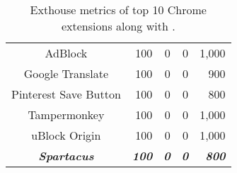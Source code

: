 {\begin{table}[t]
{\begin{tabular}{crrrr}
\rowcolor[HTML]{C0C0C0} 
AdBlock                     & 100                                & 0                                                                                        & 0                                                                                              & 1,000                                                                            \\
\rowcolor[HTML]{EFEFEF} 
Google Translate            & 100                                & 0                                                                                        & 0                                                                                              & 900                                                                              \\
\rowcolor[HTML]{C0C0C0} 
Pinterest Save Button       & 100                                & 0                                                                                        & 0                                                                                              & 800                                                                              \\
\rowcolor[HTML]{EFEFEF} 
Tampermonkey                & 100                                & 0                                                                                        & 0                                                                                              & 1,000                                                                            \\
\rowcolor[HTML]{C0C0C0} 
uBlock Origin               & 100                                & 0                                                                                        & 0                                                                                              & 1,000                                                                            \\ \midrule
\textit{\textbf{Spartacus}} & \textit{\textbf{100}}              & \textit{\textbf{0}}                                                                      & \textit{\textbf{0}}                                                                            & \textit{\textbf{800}}                                                            \\ \bottomrule
\end{tabular}
}
\caption{Exthouse metrics of top 10 Chrome extensions along with \spartacus.}
\label{tab:exthouse}
\end{table}
}


